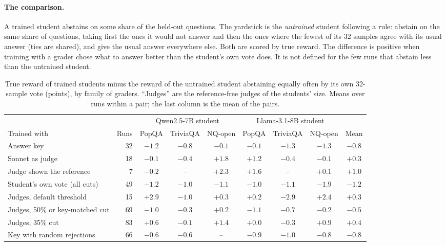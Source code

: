 \documentclass[11pt,a4paper,twocolumn]{article}
\begin{document}
\paragraph{The comparison.} A trained student abstains on some share of the held-out questions. The yardstick is the \emph{untrained} student following a rule: abstain on the same share of questions, taking first the ones it would not answer and then the ones where the fewest of its 32 samples agree with its usual answer (ties are shared), and give the usual answer everywhere else. Both are scored by true reward. The difference is positive when training with a grader chose what to answer better than the student's own vote does. It is not defined for the few runs that abstain less than the untrained student.

\begin{table}[t]
\small
\centering
\setlength{\tabcolsep}{3.8pt}
\begin{tabular}{@{}lrccccccc@{}}
\toprule
 & & \multicolumn{3}{c}{Qwen2.5-7B student} & \multicolumn{3}{c}{Llama-3.1-8B student} & \\
\cmidrule(lr){3-5}\cmidrule(lr){6-8}
Trained with & Runs & PopQA & TriviaQA & NQ-open & PopQA & TriviaQA & NQ-open & Mean \\
\midrule
Answer key & 32 & $-1.2$ & $-0.8$ & $-0.1$ & $-0.1$ & $-1.3$ & $-1.3$ & $-0.8$ \\
Sonnet as judge & 18 & $-0.1$ & $-0.4$ & $+1.8$ & $+1.2$ & $-0.4$ & $-0.1$ & $+0.3$ \\
Judge shown the reference & 7 & $-0.2$ & -- & $+2.3$ & $+1.6$ & -- & $+0.1$ & $+1.0$ \\
Student's own vote (all cuts) & 49 & $-1.2$ & $-1.0$ & $-1.1$ & $-1.0$ & $-1.1$ & $-1.9$ & $-1.2$ \\
Judges, default threshold & 15 & $+2.9$ & $-1.0$ & $+0.3$ & $+0.2$ & $-2.9$ & $+2.4$ & $+0.3$ \\
Judges, 50\% or key-matched cut & 69 & $-1.0$ & $-0.3$ & $+0.2$ & $-1.1$ & $-0.7$ & $-0.2$ & $-0.5$ \\
Judges, 35\% cut & 83 & $+0.6$ & $-0.1$ & $+1.4$ & $+0.0$ & $-0.3$ & $+0.9$ & $+0.4$ \\
Key with random rejections & 66 & $-0.6$ & $-0.6$ & -- & $-0.9$ & $-1.0$ & $-0.8$ & $-0.8$ \\
\bottomrule
\end{tabular}
\caption{True reward of trained students minus the reward of the untrained student abstaining equally often by its own 32-sample vote (points), by family of graders. ``Judges'' are the reference-free judges of the students' size. Means over runs within a pair; the last column is the mean of the pairs.}
\label{tab:vote}
\end{table}
\end{document}
